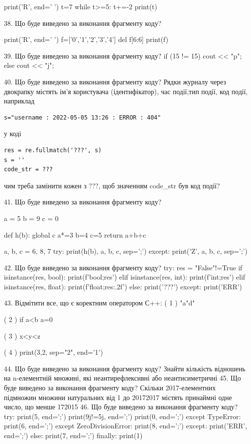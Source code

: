 \documentclass[11pt]{article}
\begin{document}
print('R', end=' ')
t=7
while t>=5:
    t+=-2
print(t)


38. Що буде виведено за виконання фрагменту коду?

print('R', end=' ')
f=['0','1','2','3','4']
del f[6:6]
print(f)


39. Що буде виведено за виконання фрагменту коду?
if (15 != 15)
    cout << "p";
else
    cout << "j";


40. Що буде виведено за виконання фрагменту коду?
Рядки журналу через двокрапку містять ім'я користувача (ідентифікатор), час події,тип події, код події, наприклад
\begin{verbatim}
s="username : 2022-05-05 13:26 : ERROR : 404"
\end{verbatim}
у коді 
\begin{verbatim}
res = re.fullmatch('???', s) 
s = ''
code_str = ??? 
\end{verbatim}
чим треба замінити кожен з ???, щоб значенням code\_str був код події? 



41. Що буде виведено за виконання фрагменту коду?

a = 5
b = 9
c = 0

def h(b):
global c    a*=3
    b=4
    c=5
    return a+b+c

a, b, c = 6, 8, 7
try:
    print(h(b), a, b, c, sep=';')
except:
    print('Z', a, b, c, sep=';')

42. Що буде виведено за виконання фрагменту коду?
try:
    res = "False"!=True
    if isinstance(res, bool):
        print(f'bool;{res}')
    elif isinstance(res, int):
        print(f'int;{res}')
    elif isinstance(res, float):
        print(f'float;{res:.2f}')
    else:
        print('???')
except:
    print('ERR')

43. %
Відмітити все, що є коректним оператором С++:
( 1 ) "a"d"

( 2 ) if a<b a=0

( 3 ) x<y<z

( 4 ) print(3,2, sep="2", end='1')

44. Що буде виведено за виконання фрагменту коду?
Знайти кількість відношень на n-елементній множині, які неантирефлексивні або неантисиметричні
45. Що буде виведено за виконання фрагменту коду?
Скільки 2017-елементних підмножин множини натуральних від 1 до 20172017 містять принаймні одне число, що менше 172015
46. Що буде виведено за виконання фрагменту коду?
try:
    print(5, end=';')
    print(9j!=5j, end=';')
    print(0, end=';')
except TypeError:
    print(6, end=';')
except ZeroDivisionError:
    print(8, end=';')
except:
    print('ERR', end=';')
else:
    print(7, end=';')
finally:
    print(1)
\end{document}
